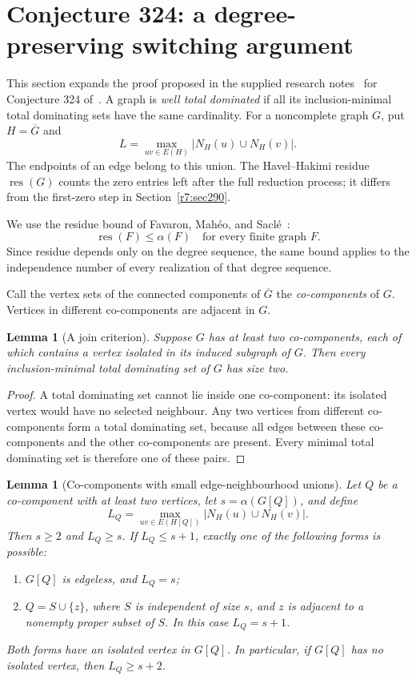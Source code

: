 \documentclass[11pt,a4paper]{article}
\newtheorem{lemma}[theorem]{Lemma}
\theoremstyle{remark}
\begin{document}
\section{Conjecture 324: a degree-preserving switching argument}
\label{r7:sec324}

This section expands the proof proposed in the supplied research
notes~\cite{UserNotes} for Conjecture 324 of~\cite{WOWII}.
A graph is \emph{well total dominated} if all
its inclusion-minimal total dominating sets have the same cardinality.
For a noncomplete graph $G$, put $H=\overline G$ and
\[
 L=\max_{uv\in E(H)}|N_H(u)\cup N_H(v)|.
\]
The endpoints of an edge belong to this union.  The Havel--Hakimi
residue $\operatorname{res}(G)$ counts the zero entries left after
the full reduction process; it differs from the first-zero step in
Section~\ref{r7:sec290}.

We use the residue bound of Favaron, Mah\'eo, and Sacl\'e~\cite{FMS91}:
\begin{equation}
 \operatorname{res}(F)\le\alpha(F)
 \quad\text{for every finite graph }F.
 \label{r7:324-residue-bound}
\end{equation}
Since residue depends only on the degree sequence, the same bound
applies to the independence number of every realization of that
degree sequence.

Call the vertex sets of the connected components of $\overline G$
the \emph{co-components} of $G$.  Vertices in different co-components
are adjacent in $G$.

\begin{lemma}[A join criterion]
\label{r7:324-join}
Suppose $G$ has at least two co-components, each of which contains
a vertex isolated in its induced subgraph of $G$.  Then every
inclusion-minimal total dominating set of $G$ has size two.
\end{lemma}

\begin{proof}
A total dominating set cannot lie inside one co-component: its
isolated vertex would have no selected neighbour.  Any two vertices
from different co-components form a total dominating set, because
all edges between these co-components and the other co-components
are present.  Every minimal total dominating set is therefore one
of these pairs.
\end{proof}

\begin{lemma}[Co-components with small edge-neighbourhood unions]
\label{r7:324-classification}
Let $Q$ be a co-component with at least two vertices, let
$s=\alpha(G[Q])$, and define
\[
 L_Q=\max_{uv\in E(H[Q])}|N_H(u)\cup N_H(v)|.
\]
Then $s\ge2$ and $L_Q\ge s$.  If $L_Q\le s+1$, exactly one of the
following forms is possible:
\begin{enumerate}
 \item $G[Q]$ is edgeless, and $L_Q=s$;
 \item $Q=S\cup\{z\}$, where $S$ is independent of size $s$, and
       $z$ is adjacent to a nonempty proper subset of $S$.
       In this case $L_Q=s+1$.
\end{enumerate}
Both forms have an isolated vertex in $G[Q]$.  In particular, if
$G[Q]$ has no isolated vertex, then $L_Q\ge s+2$.
\end{lemma}
\end{document}
